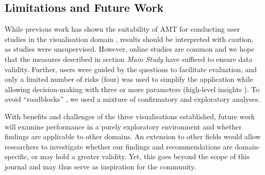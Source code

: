 \documentclass[final,5p,times,twocolumn,authoryear]{elsarticle}
\begin{document}




\subsection{Limitations and Future Work} %
\label{sub:limitations}
While previous work has shown the suitability of AMT for conducting user studies in the visualisation domain \citep{heer2010crowdsourcing, yang_understand_2014}, results should be interpreted with caution, as studies were unsupervised. However, online studies are common and we hope that the measures described in section \emph{Main Study} have sufficed to ensure data validity. Further, users were guided by the questions to facilitate evaluation, and only a limited number of risks (four) was used to simplify the application while allowing decision-making with three or more parameters (high-level insights \citep{yang_understand_2014}). To avoid ``roadblocks'' \citep{kwon2011visual}, we used a mixture of confirmatory and exploratory analyses. 

With benefits and challenges of the three visualisations established, future work will examine performance in a purely exploratory environment and whether findings are applicable to other domains. An extension to other fields would allow researchers to investigate whether our findings and recommendations are domain-specific, or may hold a greater validity. Yet, this goes beyond the scope of this journal and may thus serve as inspiration for the community.


\end{document}
